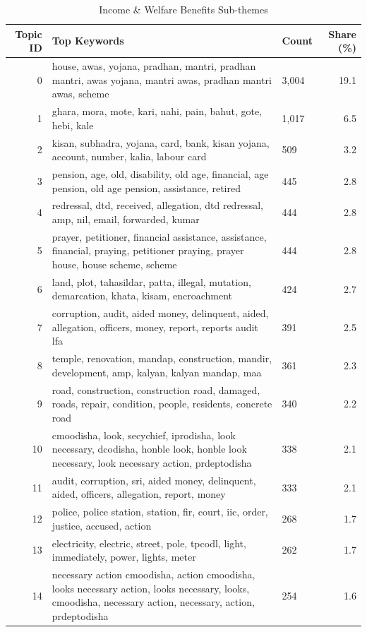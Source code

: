 \begin{table}[htbp]
\centering
\caption{Income \& Welfare Benefits Sub-themes}
\label{tab:topics_Income_Welfare_Benefits}
\begin{tabular}{rlp{7cm}r}
\toprule
Topic ID & Top Keywords & Count & Share (\%) \\
\midrule
0 & house, awas, yojana, pradhan, mantri, pradhan mantri, awas yojana, mantri awas, pradhan mantri awas, scheme & 3,004 & 19.1 \\
1 & ghara, mora, mote, kari, nahi, pain, bahut, gote, hebi, kale & 1,017 & 6.5 \\
2 & kisan, subhadra, yojana, card, bank, kisan yojana, account, number, kalia, labour card & 509 & 3.2 \\
3 & pension, age, old, disability, old age, financial, age pension, old age pension, assistance, retired & 445 & 2.8 \\
4 & redressal, dtd, received, allegation, dtd redressal, amp, nil, email, forwarded, kumar & 444 & 2.8 \\
5 & prayer, petitioner, financial assistance, assistance, financial, praying, petitioner praying, prayer house, house scheme, scheme & 444 & 2.8 \\
6 & land, plot, tahasildar, patta, illegal, mutation, demarcation, khata, kisam, encroachment & 424 & 2.7 \\
7 & corruption, audit, aided money, delinquent, aided, allegation, officers, money, report, reports audit lfa & 391 & 2.5 \\
8 & temple, renovation, mandap, construction, mandir, development, amp, kalyan, kalyan mandap, maa & 361 & 2.3 \\
9 & road, construction, construction road, damaged, roads, repair, condition, people, residents, concrete road & 340 & 2.2 \\
10 & cmoodisha, look, secychief, iprodisha, look necessary, dcodisha, honble look, honble look necessary, look necessary action, prdeptodisha & 338 & 2.1 \\
11 & audit, corruption, sri, aided money, delinquent, aided, officers, allegation, report, money & 333 & 2.1 \\
12 & police, police station, station, fir, court, iic, order, justice, accused, action & 268 & 1.7 \\
13 & electricity, electric, street, pole, tpcodl, light, immediately, power, lights, meter & 262 & 1.7 \\
14 & necessary action cmoodisha, action cmoodisha, looks necessary action, looks necessary, looks, cmoodisha, necessary action, necessary, action, prdeptodisha & 254 & 1.6 \\

\end{tabular}
\end{table}
